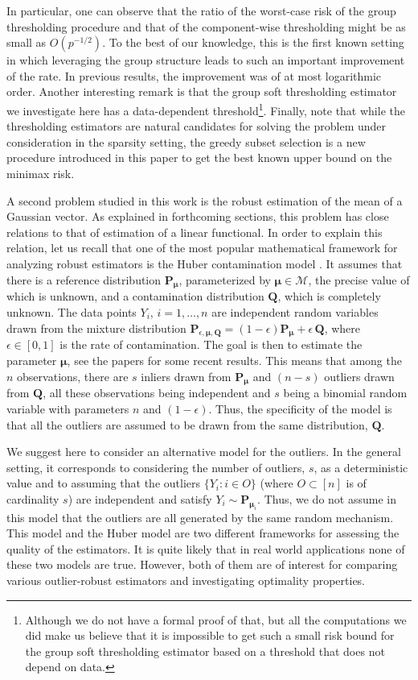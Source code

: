 \documentclass[sts,preprint,reqno,a4paper]{imsart}
\def\bmu{\boldsymbol\mu}
\def\bfQ{\mathbf Q}
\def\prob{\mathbf P}
\theoremstyle{plain}
\theoremstyle{remark}
\theoremstyle{definition}
\begin{document}
In particular, one can observe that the ratio of the worst-case risk of the 
group thresholding procedure and that of the component-wise thresholding
might be as small as  $O(p^{-1/2})$. To the best of our knowledge, this is the 
first known setting in which leveraging the group structure leads to
such an important improvement of the rate. In previous results, the improvement was
of at most logarithmic order. Another interesting remark is
that the group soft thresholding estimator we investigate here has a
data-dependent threshold\footnote{Although we do not have a formal proof of that, 
but all the computations we did make us believe that it is impossible to get such a small risk bound for the group
soft thresholding estimator based on a threshold that does not depend on
data.}. Finally, note that while the thresholding 
estimators are natural candidates for solving the problem under consideration
in the sparsity setting, the greedy subset selection is a new procedure
introduced in this paper to get the best known upper bound on the minimax
risk.

A second problem studied in this work is the robust estimation of the mean of
a Gaussian vector. As explained in forthcoming sections, this problem has close
relations to that of estimation of a linear functional. In order to explain this
relation, let us recall that one of the most popular mathematical framework for
analyzing robust estimators is the Huber contamination model \citep{huber1964}. 
It assumes that
there is a reference distribution $\prob_{\bmu}$, parameterized by $\bmu\in\mathcal M$, 
the precise value of which is unknown, and a contamination distribution $\bfQ$, 
which is completely unknown. The data points $Y_i$, $i=1,\ldots,n$ are independent random variables drawn from the mixture distribution $\mathbf P_{\epsilon,\bmu,\bfQ} = 
(1-\epsilon)\prob_{\bmu}+\epsilon\,\bfQ$, where $\epsilon\in[0,1]$ is the rate
of contamination. The goal is then to estimate the parameter $\bmu$, see the 
papers \citep{Gao2015,chen2016} for some recent results. This means that among
the $n$ observations, there are $s$ inliers drawn from $\prob_{\bmu}$  and
$(n-s)$ outliers drawn from $\bfQ$, all these observations being independent and
$s$ being a binomial random variable with parameters $n$ and $(1-\epsilon)$. 
Thus, the specificity of the model is that all the outliers are assumed to be 
drawn from the same distribution, $\bfQ$. 

We suggest here to consider an alternative model for the outliers. In the general
setting, it corresponds to considering the number of outliers, $s$, as a 
deterministic value and to assuming that the outliers $\{Y_i:i\in O\}$ (where
$O\subset [n]$ is of cardinality $s$) are independent and satisfy $Y_i\sim 
\prob_{\bmu_i}$. Thus, we do not assume in this model that the outliers are all generated by the same random mechanism. This model and the Huber model are two
different frameworks for assessing the quality of the estimators. It is quite
likely that in real world applications none of these two models are true. However, 
both of them are of interest for comparing various outlier-robust estimators and
investigating optimality properties.
\end{document}
